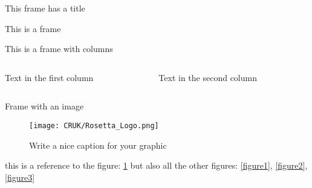 \begin{frame}{This frame has a title}

This is a frame
\end{frame}

\begin{frame}{This is a frame with columns}
\begin{columns}
\begin{column}{.5\paperwidth}
Text in the first column
\end{column}
\begin{column}{.5\paperwidth}
Text in the second column
\end{column}
\end{columns}
\end{frame}

\begin{frame}{Frame with an image}
\begin{figure}[H]
	\label{figure4}
	\centering
    \texttt{[image: CRUK/Rosetta\_Logo.png]}
    \caption{Write a nice caption for your graphic}
\end{figure}
this is a reference to the figure: \cref{figure4}
but also all the other figures:
\cref{figure1}, \cref{figure2}, \cref{figure3}
\end{frame}